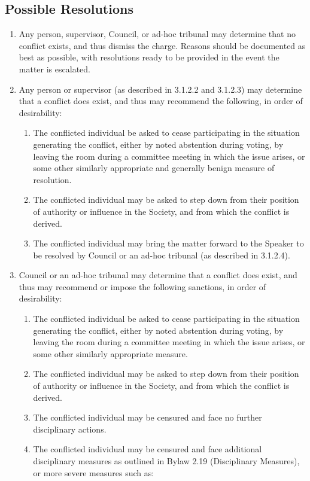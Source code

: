 \subsection{Possible Resolutions}
\begin{enumerate} [align=left]
\item Any person, supervisor, Council, or ad-hoc tribunal may determine that no conflict exists, and thus dismiss the charge. Reasons should be documented as best as possible, with resolutions ready to be provided in the event the matter is escalated.
\item Any person or supervisor (as described in 3.1.2.2 and 3.1.2.3) may determine that a conflict does exist, and thus may recommend the following, in order of desirability:
\begin{enumerate} [label*=\arabic*., align=left]
\item The conflicted individual be asked to cease participating in the situation generating the conflict, either by noted abstention during voting, by leaving the room during a committee meeting in which the issue arises, or some other similarly appropriate and generally benign measure of resolution.
\item The conflicted individual may be asked to step down from their position of authority or influence in the Society, and from which the conflict is derived.
\item The conflicted individual may bring the matter forward to the Speaker to be resolved by Council or an ad-hoc tribunal (as described in 3.1.2.4).
\end{enumerate}
\item Council or an ad-hoc tribunal may determine that a conflict does exist, and thus may recommend or impose the following sanctions, in order of desirability:
\begin{enumerate} [label*=\arabic*., align=left]
\item The conflicted individual be asked to cease participating in the situation generating the conflict, either by noted abstention during voting, by leaving the room during a committee meeting in which the issue arises, or some other similarly appropriate measure.
\item The conflicted individual may be asked to step down from their position of authority or influence in the Society, and from which the conflict is derived.
\item The conflicted individual may be censured and face no further disciplinary actions. 
\item The conflicted individual may be censured and face additional disciplinary measures as outlined in Bylaw 2.19 (Disciplinary Measures), or more severe measures such as:

\end{enumerate}
\end{enumerate}
